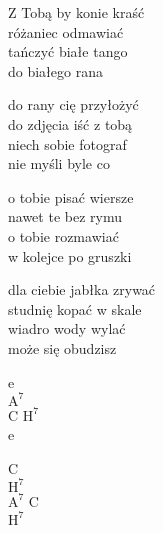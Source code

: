 \begin{text}
    Z Tobą by konie kraść\\
    różaniec odmawiać\\
    tańczyć białe tango\\
    do białego rana

    do rany cię przyłożyć\\
    do zdjęcia iść z tobą\\
    niech sobie fotograf\\
    nie myśli byle co

    o tobie pisać wiersze\\
    nawet te bez rymu\\
    o tobie rozmawiać\\
    w kolejce po gruszki

    dla ciebie jabłka zrywać\\
    studnię kopać w skale\\
    wiadro wody wylać\\
    może się obudzisz
\end{text}
\begin{chord}
    e\\
    $\mathrm{A^{7}}$\\
    C $\mathrm{H^{7}}$\\
    e

    C\\
    $\mathrm{H^{7}}$\\
    $\mathrm{A^{7}}$ C\\
    $\mathrm{H^{7}}$
\end{chord}
